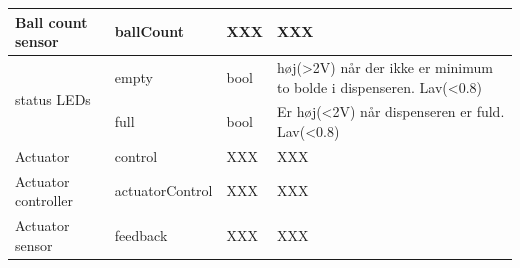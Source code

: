 \documentclass[Arkitektur/System_main.tex]{subfiles}
\begin{document}
\begin{table}[]
\begin{tabular}{|l|l|l|l|}
Ball count sensor                    & ballCount         & XXX       & XXX                                                                                       \\ \hline
\multirow{2}{*}{status LEDs}         & empty             & bool      & høj(\textgreater{}2V) når der ikke er minimum to bolde i dispenseren. Lav(\textless{}0.8) \\ \cline{2-4} 
                                     & full              & bool      & Er høj(\textless{}2V) når dispenseren er fuld. Lav(\textless{}0.8)                        \\ \hline
Actuator                             & control           & XXX       & XXX                                                                                       \\ \hline
Actuator controller                  & actuatorControl   & XXX       & XXX                                                                                       \\ \hline
Actuator sensor                      & feedback          & XXX       & XXX                                                                                       \\ \hline
\end{tabular}
\end{table}
\end{document}
